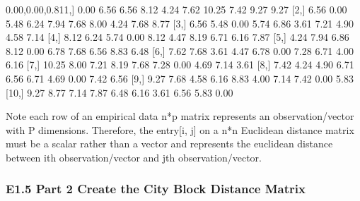 \documentclass[
]{article}
\newenvironment{Shaded}{\begin{snugshade}}{\end{snugshade}}
\newcommand{\DecValTok}[1]{\textcolor[rgb]{0.00,0.00,0.81}{#1}}
\newcommand{\FloatTok}[1]{\textcolor[rgb]{0.00,0.00,0.81}{#1}}
\newcommand{\NormalTok}[1]{#1}
\begin{document}
\begin{Shaded}
\begin{Highlighting}[]
\NormalTok{ [}\DecValTok{1}\NormalTok{,]  }\FloatTok{0.00} \FloatTok{6.56} \FloatTok{6.56} \FloatTok{8.12} \FloatTok{4.24} \FloatTok{7.62} \FloatTok{10.25} \FloatTok{7.42} \FloatTok{9.27}  \FloatTok{9.27}
\NormalTok{ [}\DecValTok{2}\NormalTok{,]  }\FloatTok{6.56} \FloatTok{0.00} \FloatTok{5.48} \FloatTok{6.24} \FloatTok{7.94} \FloatTok{7.68}  \FloatTok{8.00} \FloatTok{4.24} \FloatTok{7.68}  \FloatTok{8.77}
\NormalTok{ [}\DecValTok{3}\NormalTok{,]  }\FloatTok{6.56} \FloatTok{5.48} \FloatTok{0.00} \FloatTok{5.74} \FloatTok{6.86} \FloatTok{3.61}  \FloatTok{7.21} \FloatTok{4.90} \FloatTok{4.58}  \FloatTok{7.14}
\NormalTok{ [}\DecValTok{4}\NormalTok{,]  }\FloatTok{8.12} \FloatTok{6.24} \FloatTok{5.74} \FloatTok{0.00} \FloatTok{8.12} \FloatTok{4.47}  \FloatTok{8.19} \FloatTok{6.71} \FloatTok{6.16}  \FloatTok{7.87}
\NormalTok{ [}\DecValTok{5}\NormalTok{,]  }\FloatTok{4.24} \FloatTok{7.94} \FloatTok{6.86} \FloatTok{8.12} \FloatTok{0.00} \FloatTok{6.78}  \FloatTok{7.68} \FloatTok{6.56} \FloatTok{8.83}  \FloatTok{6.48}
\NormalTok{ [}\DecValTok{6}\NormalTok{,]  }\FloatTok{7.62} \FloatTok{7.68} \FloatTok{3.61} \FloatTok{4.47} \FloatTok{6.78} \FloatTok{0.00}  \FloatTok{7.28} \FloatTok{6.71} \FloatTok{4.00}  \FloatTok{6.16}
\NormalTok{ [}\DecValTok{7}\NormalTok{,] }\FloatTok{10.25} \FloatTok{8.00} \FloatTok{7.21} \FloatTok{8.19} \FloatTok{7.68} \FloatTok{7.28}  \FloatTok{0.00} \FloatTok{4.69} \FloatTok{7.14}  \FloatTok{3.61}
\NormalTok{ [}\DecValTok{8}\NormalTok{,]  }\FloatTok{7.42} \FloatTok{4.24} \FloatTok{4.90} \FloatTok{6.71} \FloatTok{6.56} \FloatTok{6.71}  \FloatTok{4.69} \FloatTok{0.00} \FloatTok{7.42}  \FloatTok{6.56}
\NormalTok{ [}\DecValTok{9}\NormalTok{,]  }\FloatTok{9.27} \FloatTok{7.68} \FloatTok{4.58} \FloatTok{6.16} \FloatTok{8.83} \FloatTok{4.00}  \FloatTok{7.14} \FloatTok{7.42} \FloatTok{0.00}  \FloatTok{5.83}
\NormalTok{[}\DecValTok{10}\NormalTok{,]  }\FloatTok{9.27} \FloatTok{8.77} \FloatTok{7.14} \FloatTok{7.87} \FloatTok{6.48} \FloatTok{6.16}  \FloatTok{3.61} \FloatTok{6.56} \FloatTok{5.83}  \FloatTok{0.00}
\end{Highlighting}
\end{Shaded}

Note each row of an empirical data n*p matrix represents an
observation/vector with P dimensions. Therefore, the entry{[}i, j{]} on
a n*n Euclidean distance matrix must be a scalar rather than a vector
and represents the euclidean distance between ith observation/vector and
jth observation/vector.

\hypertarget{e1.5-part-2-create-the-city-block-distance-matrix}{%
\subsubsection{E1.5 Part 2 Create the City Block Distance
Matrix}\label{e1.5-part-2-create-the-city-block-distance-matrix}}
\end{document}
